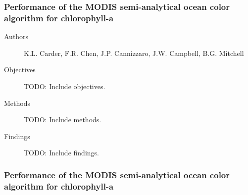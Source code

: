 \begin{frame}\frametitle{Performance of the MODIS semi-analytical ocean color algorithm for chlorophyll-a} 
\begin{description}
    \item[Authors] K.L. Carder, F.R. Chen, J.P. Cannizzaro, J.W. Campbell, B.G. Mitchell
    \item[Objectives] TODO: Include objectives.
    \item[Methods] TODO: Include methods.
    \item[Findings] TODO: Include findings.
\end{description}

\end{frame}

\begin{frame}\frametitle{Performance of the MODIS semi-analytical ocean color algorithm for chlorophyll-a} 

\end{frame}
